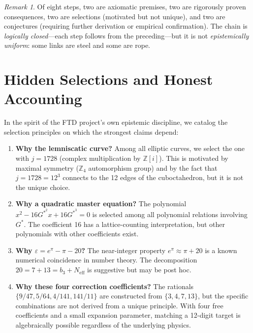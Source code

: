 \documentclass[11pt,twoside]{article}
\theoremstyle{definition}
\theoremstyle{plain}
\theoremstyle{remark}
\newtheorem{remark}[axiom]{Remark}
\newcommand{\Gstar}{G^{*}}
\newcommand{\Integer}{\mathbb{Z}}
\begin{document}
\begin{remark}
Of eight steps, two are axiomatic premises, two are rigorously proven consequences, two are selections (motivated but not unique), and two are conjectures (requiring further derivation or empirical confirmation). The chain is \emph{logically closed}---each step follows from the preceding---but it is not \emph{epistemically uniform}: some links are steel and some are rope.
\end{remark}

\section{Hidden Selections and Honest Accounting}
\label{sec:selections}

In the spirit of the FTD project's own epistemic discipline, we catalog the selection principles on which the strongest claims depend:

\begin{enumerate}[label=\textbf{SP\arabic*}., leftmargin=3em]
    \item \textbf{Why the lemniscatic curve?} Among all elliptic curves, we select the one with $j = 1728$ (complex multiplication by $\Integer[i]$). This is motivated by maximal symmetry ($\mathbb{Z}_4$ automorphism group) and by the fact that $j = 1728 = 12^3$ connects to the 12 edges of the cuboctahedron, but it is not the unique choice.

    \item \textbf{Why a quadratic master equation?} The polynomial $x^2 - 16\Gstar^2 x + 16\Gstar^3 = 0$ is selected among all polynomial relations involving $\Gstar$. The coefficient 16 has a lattice-counting interpretation, but other polynomials with other coefficients exist.

    \item \textbf{Why $\varepsilon = e^\pi - \pi - 20$?} The near-integer property $e^\pi \approx \pi + 20$ is a known numerical coincidence in number theory. The decomposition $20 = 7 + 13 = b_3 + N_{\text{eff}}$ is suggestive but may be post hoc.

    \item \textbf{Why these four correction coefficients?} The rationals $\{9/47, 5/64, 4/141, 141/11\}$ are constructed from $\{3, 4, 7, 13\}$, but the specific combinations are not derived from a unique principle. With four free coefficients and a small expansion parameter, matching a 12-digit target is algebraically possible regardless of the underlying physics.
\end{enumerate}
\end{document}
